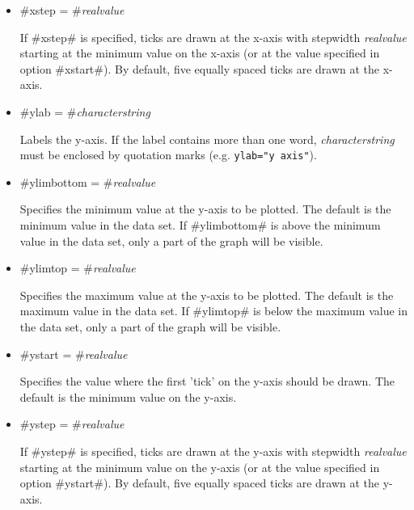 \begin{itemize}
\item #xstep = #{\em realvalue}

If #xstep# is specified,  ticks are drawn at the x-axis with
stepwidth {\em realvalue} starting at the minimum value on the
x-axis (or at the value specified in option #xstart#). By default,
five equally spaced ticks are drawn at the x-axis.

\item #ylab = #{\em characterstring}

Labels the y-axis. If the label contains more than one word, {\em
characterstring} must be enclosed by quotation marks (e.g.
\texttt{ylab="y axis"}).

\item #ylimbottom = #{\em realvalue}

Specifies the minimum value at the y-axis to be plotted. The
default is the minimum value in the data set. If #ylimbottom# is
above the minimum value in the data set, only a part of the graph
will be visible.

\item #ylimtop = #{\em realvalue}

Specifies the maximum value at the y-axis to be plotted. The
default is the maximum value in the data set. If #ylimtop# is
below the maximum value in the data set, only a part of the graph
will be visible.

\item #ystart = #{\em realvalue}

Specifies the value where the first 'tick' on the y-axis should be
drawn. The default is the minimum value on the y-axis.

\item #ystep = #{\em realvalue}

If #ystep# is specified,  ticks are drawn at the y-axis with
stepwidth {\em realvalue} starting at the minimum value on the
y-axis (or at the value specified in option #ystart#). By default,
five equally spaced ticks are drawn at the y-axis.
\end{itemize}


